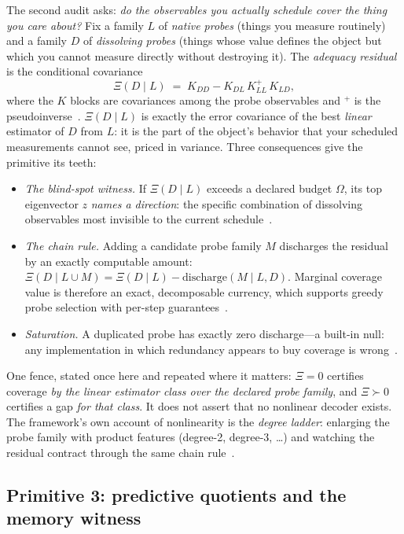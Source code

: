 \documentclass[11pt]{article}
\newcommand{\Xires}{\Xi(D \mid L)}
\theoremstyle{definition}
\begin{document}
The second audit asks: \emph{do the observables you actually schedule cover the thing you care about?} Fix a family $L$ of \emph{native probes} (things you measure routinely) and a family $D$ of \emph{dissolving probes} (things whose value defines the object but which you cannot measure directly without destroying it). The \emph{adequacy residual} is the conditional covariance
\begin{equation}
\Xires \;=\; K_{DD} - K_{DL}\,K_{LL}^{+}\,K_{LD},
\label{eq:xi}
\end{equation}
where the $K$ blocks are covariances among the probe observables and ${}^{+}$ is the pseudoinverse~\cite{sbt-xi}. $\Xires$ is exactly the error covariance of the best \emph{linear} estimator of $D$ from $L$: it is the part of the object's behavior that your scheduled measurements cannot see, priced in variance. Three consequences give the primitive its teeth:

\begin{itemize}
\item \emph{The blind-spot witness.} If $\Xires$ exceeds a declared budget $\Omega$, its top eigenvector $z$ \emph{names a direction}: the specific combination of dissolving observables most invisible to the current schedule~\cite{sbt-xi}.
\item \emph{The chain rule.} Adding a candidate probe family $M$ discharges the residual by an exactly computable amount: $\Xi(D \mid L \cup M) = \Xires - \mathrm{discharge}(M \mid L, D)$. Marginal coverage value is therefore an exact, decomposable currency, which supports greedy probe selection with per-step guarantees~\cite{sbt-xi}.
\item \emph{Saturation.} A duplicated probe has exactly zero discharge---a built-in null: any implementation in which redundancy appears to buy coverage is wrong~\cite{sbt-xi}.
\end{itemize}

One fence, stated once here and repeated where it matters: $\Xi = 0$ certifies coverage \emph{by the linear estimator class over the declared probe family}, and $\Xi \succ 0$ certifies a gap \emph{for that class}. It does not assert that no nonlinear decoder exists. The framework's own account of nonlinearity is the \emph{degree ladder}: enlarging the probe family with product features (degree-2, degree-3, \dots) and watching the residual contract through the same chain rule~\cite{sbt-xi,sbt-cast}.

\subsection{Primitive 3: predictive quotients and the memory witness}
\label{sec:sbt-quotients}
\end{document}
